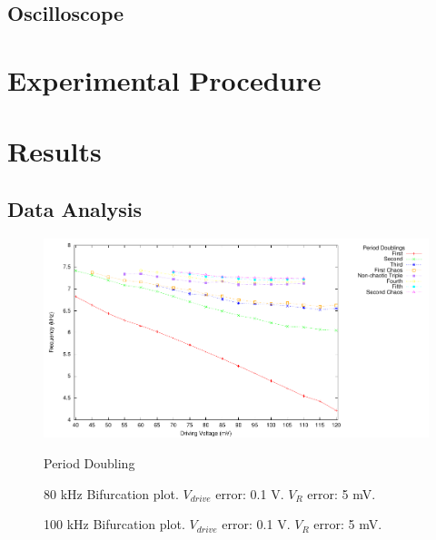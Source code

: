 \documentclass[12pt]{report}
\begin{document}
\section{Oscilloscope}
\label{sec:Oscilloscope}


\chapter{Experimental Procedure}


\chapter{Results}

\section{Data Analysis} %
\label{sec:Data Analysis}

	\begin{figure}[h]
		\centering
		\includegraphics{plots/general.pdf}
		\label{fig:periodDoubling}
		\caption{Period Doubling}
	\end{figure}



	\begin{figure}[h]
		\centering
		
		\label{fig:80khzBifurcation}
		\caption{80 kHz Bifurcation plot. $V_{drive}$ error: 0.1 V. $V_{R}$ error: 5 mV.}
	\end{figure}

	\begin{figure}[h]
		\centering
		
		\label{fig:100khzBifurcation}
		\caption{100 kHz Bifurcation plot. $V_{drive}$ error: 0.1 V. $V_{R}$ error: 5 mV.}
	\end{figure}
	
\end{document}
